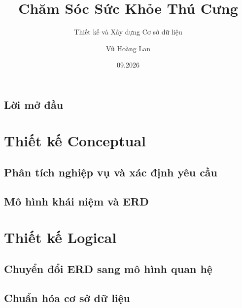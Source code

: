 \documentclass[letterpaper,11pt,leqno,openany]{book}
\begin{document}
\title{Chăm Sóc Sức Khỏe Thú Cưng}

\subtitle{Thiết kế và Xây dựng Cơ sở dữ liệu}

\author{Vũ Hoàng Lan}

\date{09.2026}

\begin{titlepage}
\maketitle
\end{titlepage}

\frontmatter
\tableofcontents
\listoftables
\listoffigures
\chapter{Lời mở đầu}


\mainmatter

\part{Thiết kế Conceptual}\label{p:conceptual}

\chapter{Phân tích nghiệp vụ và xác định yêu cầu}\label{c:requirements}


\chapter{Mô hình khái niệm và ERD}\label{c:conceptual}


\part{Thiết kế Logical}\label{p:logical}

\chapter{Chuyển đổi ERD sang mô hình quan hệ}\label{c:logical}


\chapter{Chuẩn hóa cơ sở dữ liệu}\label{c:normalization}

\end{document}
